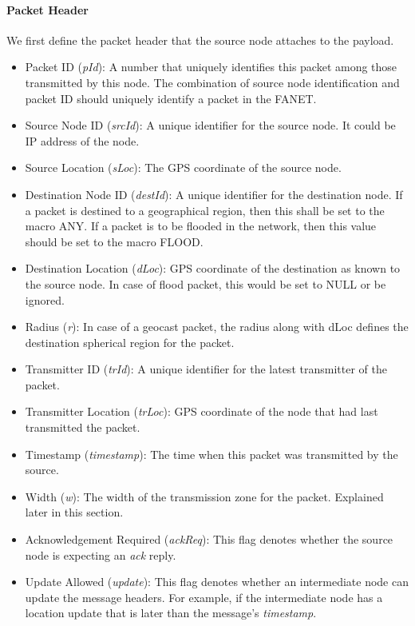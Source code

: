 \paragraph{Packet Header} \label{packet_header}
We first define the packet header that the source node attaches to the payload.
\begin{itemize}
\item Packet ID (\emph{pId}): A number that uniquely identifies this packet among those transmitted by this node. The combination of source node identification and packet ID should uniquely identify a packet in the FANET. 
\item Source Node ID (\emph{srcId}): A unique identifier for the source node. It could be IP address of the node.
\item Source Location (\emph{sLoc}): The GPS coordinate of the source node.
\item Destination Node ID (\emph{destId}): A unique identifier for the destination node. If a packet is destined to a geographical region, then this shall be set to the macro ANY. If a packet is to be flooded in the network, then this value should be set to the macro FLOOD. 
\item Destination Location (\emph{dLoc}): GPS coordinate of the destination as known to the source node. In case of flood packet, this would be set to NULL or be ignored. 
\item Radius (\emph{r}): In case of a geocast packet, the radius along with dLoc defines the destination spherical region for the packet.
\item Transmitter ID (\emph{trId}): A unique identifier for the latest transmitter of the packet.
\item Transmitter Location (\emph{trLoc}): GPS coordinate of the node that had last transmitted the packet.
\item Timestamp (\emph{timestamp}): The time when this packet was transmitted by the source.
\item Width (\emph{w}): The width of the transmission zone for the packet. Explained later in this section.
\item Acknowledgement Required (\emph{ackReq}): This flag denotes whether the source node is expecting an \emph{ack} reply.
\item Update Allowed (\emph{update}): This flag denotes whether an intermediate node can update the message headers. For example, if the intermediate node has a location update that is later than the message's \emph{timestamp}.

\end{itemize}


